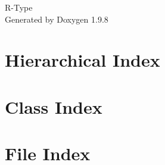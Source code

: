 \documentclass[twoside]{book}
\newcommand{\+}{\discretionary{\mbox{\scriptsize$\hookleftarrow$}}{}{}}
\newcommand{\clearemptydoublepage}{%
    \newpage{\pagestyle{empty}\cleardoublepage}%
  }
\begin{document}
  \raggedbottom
    \hypersetup{pageanchor=false,
                bookmarksnumbered=true,
                pdfencoding=unicode
               }
  \begin{titlepage}
  \vspace*{7cm}
  \begin{center}%
  {\Large R-\/\+Type}\\
  \vspace*{1cm}
  {\large Generated by Doxygen 1.9.8}\\
  \end{center}
  \end{titlepage}
  \clearemptydoublepage
  \tableofcontents
  \clearemptydoublepage
  \hypersetup{pageanchor=true}
\chapter{Hierarchical Index}

\chapter{Class Index}

\chapter{File Index}

\end{document}
